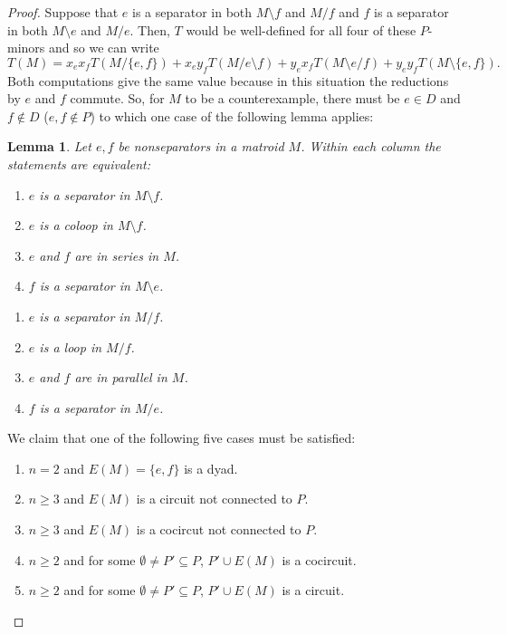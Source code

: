 \documentclass[12pt,leqno]{amsart}
\newtheorem{lem}{Lemma}
\theoremstyle{remark}
\begin{document}
\begin{proof}
Suppose that $e$ is a separator in both $M\setminus f$ and 
$M/f$ and $f$ is a separator in both 
$M\setminus e$ and $M/e$.  Then, 
$T$ would
be well-defined for all four of these $P$-minors and so
we can write 
\[
T(M)=x_e x_f T(M/\{e,f\}) + x_e y_f T(M/e\setminus f)
+ y_e x_f T(M\setminus e/f)
+ y_e y_f T(M\setminus\{e,f\}).
\]
Both computations give the same value because in this situation
the reductions by $e$ and $f$ commute. 
So, for $M$ to be a counterexample, there must be $e\in D$
and $f\not\in D$ ($e, f\not\in P$)
to which one case of the following lemma applies:

\begin{lem}
\cite{MR93a:05047}
Let $e , f$ be nonseparators in a matroid $M$. Within each column the
statements are equivalent:

\begin{minipage}{0.5\textwidth}
\begin{enumerate}
\item
$e$ is a separator in $M\setminus f$.
\item
$e$ is a coloop in $M\setminus f$.
\item
$e$ and $f$ are in series in $M$.
\item
$f$ is a separator in $M\setminus e$.
\end{enumerate}
\end{minipage}
\begin{minipage}{0.5\textwidth}
\begin{enumerate}
\item
$e$ is a separator in $M/ f$.
\item
$e$ is a loop in $M/ f$.
\item
$e$ and $f$ are in parallel in $M$.
\item
$f$  is a separator in $M/e$.
\end{enumerate}
\end{minipage}
\end{lem}

We claim that one of the following five cases must be satisfied:
\begin{enumerate}
\item 
$n=2$ and $E(M)=\{e,f\}$ is a dyad.
\item
$n\geq 3$ and $E(M)$ is a circuit not connected to $P$.
\item
$n\geq 3$ and $E(M)$ is a cocircut not connected to $P$.
\item
$n\geq 2$ and for some $\emptyset\neq P'\subseteq P$,
$P'\cup E(M)$ is a cocircuit.
\item
$n\geq 2$ and for some $\emptyset\neq P'\subseteq P$,
$P'\cup E(M)$ is a circuit.
\end{enumerate}


\end{proof}
\end{document}

